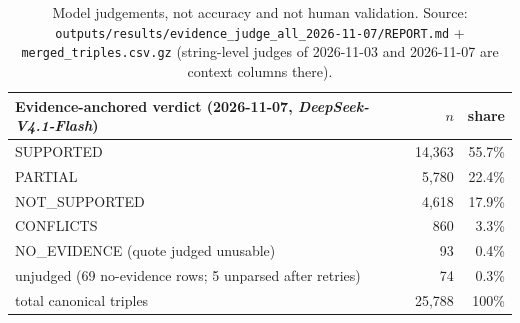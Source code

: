\documentclass[11pt,a4paper]{article}
\begin{document}
\begin{table}[h]
\centering
\begin{tabular}{lrr}
\toprule
Evidence-anchored verdict (2026-11-07, \emph{DeepSeek-V4.1-Flash}) & $n$ & share \\
\midrule
SUPPORTED & 14{,}363 & 55.7\% \\
PARTIAL & 5{,}780 & 22.4\% \\
NOT\_SUPPORTED & 4{,}618 & 17.9\% \\
CONFLICTS & 860 & 3.3\% \\
NO\_EVIDENCE (quote judged unusable) & 93 & 0.4\% \\
unjudged (69 no-evidence rows; 5 unparsed after retries) & 74 & 0.3\% \\
\midrule
total canonical triples & 25{,}788 & 100\% \\
\bottomrule
\end{tabular}
\caption{Model judgements, not accuracy and not human validation.
Source: \texttt{outputs/results/evidence\_judge\_all\_2026-11-07/REPORT.md} +
\texttt{merged\_triples.csv.gz} (string-level judges of 2026-11-03 and 2026-11-07 are context
columns there).}
\end{table}
\end{document}
